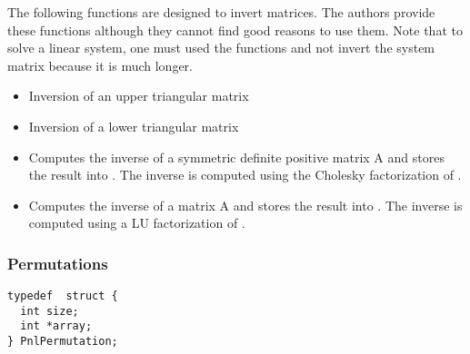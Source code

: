 The following functions are designed to invert matrices. The authors provide
these functions although they cannot find good reasons to use them. Note that
to solve a linear system, one must used the  functions and not
invert the system matrix because it is much longer.
\begin{itemize}
\item {}
  \sshortdescribe Inversion of an upper triangular matrix  

\item {}
  \sshortdescribe Inversion of a lower triangular matrix  

\item {}
  \sshortdescribe Computes the inverse of a symmetric definite positive matrix
  A and stores the result into . The inverse is computed using the
  Cholesky factorization of .

\item {}
  \sshortdescribe Computes the inverse of a matrix A and stores the result
  into . The inverse is computed using a LU factorization of
  .
\end{itemize}

\subsubsection{Permutations}

\begin{verbatim}
typedef  struct {
  int size;
  int *array;
} PnlPermutation;
\end{verbatim}

